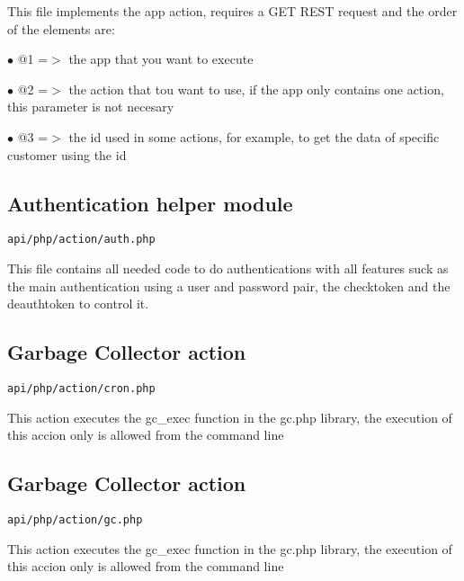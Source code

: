 \documentclass[a4paper]{article}
\begin{document}
This file implements the app action, requires a GET REST request
and the order of the elements are:

\begin{compactitem}
\item[\color{myblue}$\bullet$] @1 =$>$ the app that you want to execute
\item[\color{myblue}$\bullet$] @2 =$>$ the action that tou want to use, if the app only contains
      one action, this parameter is not necesary
\item[\color{myblue}$\bullet$] @3 =$>$ the id used in some actions, for example, to get the data
      of specific customer using the id
\end{compactitem}

\hypertarget{toc4}{}
\subsection{Authentication helper module}

\begin{lstlisting}
api/php/action/auth.php
\end{lstlisting}

This file contains all needed code to do authentications with all features suck as the
main authentication using a user and password pair, the checktoken and the deauthtoken
to control it.

\hypertarget{toc5}{}
\subsection{Garbage Collector action}

\begin{lstlisting}
api/php/action/cron.php
\end{lstlisting}

This action executes the gc\_exec function in the gc.php library, the execution
of this accion only is allowed from the command line

\hypertarget{toc6}{}
\subsection{Garbage Collector action}

\begin{lstlisting}
api/php/action/gc.php
\end{lstlisting}

This action executes the gc\_exec function in the gc.php library, the execution
of this accion only is allowed from the command line
\end{document}
